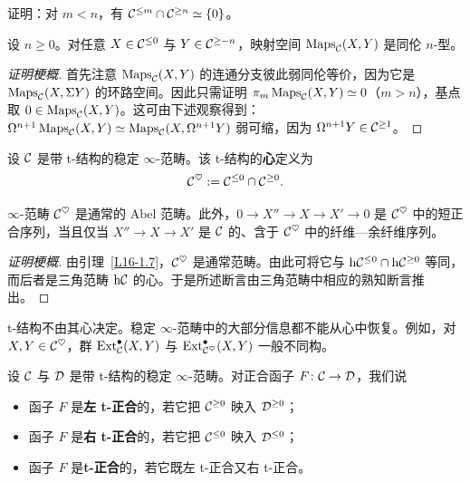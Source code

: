 \begin{exercise}\label{L16-1.6}
证明：对 $m<n$，有 $\mathcal{C}^{\le m}\cap\mathcal{C}^{\ge n}\simeq\{0\}$。
\end{exercise}

\begin{lemma}\label{L16-1.7}
设 $n\ge0$。对任意 $X\in\mathcal{C}^{\le0}$ 与 $Y\in\mathcal{C}^{\ge-n}$，映射空间 $\operatorname{Maps}_{\mathcal{C}}(X,Y)$ 是同伦 $n$-型。
\end{lemma}

\begin{proof}[证明梗概]
首先注意 $\operatorname{Maps}_{\mathcal{C}}(X,Y)$ 的连通分支彼此弱同伦等价，因为它是 $\operatorname{Maps}_{\mathcal{C}}(X,\Sigma Y)$ 的环路空间。因此只需证明 $\pi_m\operatorname{Maps}_{\mathcal{C}}(X,Y)\simeq0$（$m>n$），基点取 $0\in\operatorname{Maps}_{\mathcal{C}}(X,Y)$。这可由下述观察得到：$\Omega^{n+1}\operatorname{Maps}_{\mathcal{C}}(X,Y)\simeq\operatorname{Maps}_{\mathcal{C}}(X,\Omega^{n+1}Y)$ 弱可缩，因为 $\Omega^{n+1}Y\in\mathcal{C}^{\ge1}$。
\end{proof}

\begin{definition}\label{L16-1.8}
设 $\mathcal{C}$ 是带 t-结构的稳定 $\infty$-范畴。该 t-结构的\textbf{心}定义为
\[
\mathcal{C}^{\heartsuit}:=\mathcal{C}^{\le0}\cap\mathcal{C}^{\ge0}.
\]
\end{definition}

\begin{theorem}\label{L16-1.9}
$\infty$-范畴 $\mathcal{C}^{\heartsuit}$ 是通常的 Abel 范畴。此外，$0\to X''\to X\to X'\to 0$ 是 $\mathcal{C}^{\heartsuit}$ 中的短正合序列，当且仅当 $X''\to X\to X'$ 是 $\mathcal{C}$ 的、含于 $\mathcal{C}^{\heartsuit}$ 中的纤维—余纤维序列。
\end{theorem}

\begin{proof}[证明梗概]
由引理~\ref{L16-1.7}，$\mathcal{C}^{\heartsuit}$ 是通常范畴。由此可将它与 $\mathrm{h}\mathcal{C}^{\le0}\cap\mathrm{h}\mathcal{C}^{\ge0}$ 等同，而后者是三角范畴 $\mathrm{h}\mathcal{C}$ 的心。于是所述断言由三角范畴中相应的熟知断言推出。
\end{proof}

\begin{warning}\label{L16-1.10}
t-结构不由其心决定。稳定 $\infty$-范畴中的大部分信息都不能从心中恢复。例如，对 $X,Y\in\mathcal{C}^{\heartsuit}$，群 $\operatorname{Ext}^{\bullet}_{\mathcal{C}}(X,Y)$ 与 $\operatorname{Ext}^{\bullet}_{\mathcal{C}^{\heartsuit}}(X,Y)$ 一般不同构。
\end{warning}

\begin{definition}\label{L16-1.11}
设 $\mathcal{C}$ 与 $\mathcal{D}$ 是带 t-结构的稳定 $\infty$-范畴。对正合函子 $F\colon\mathcal{C}\to\mathcal{D}$，我们说
\begin{itemize}[leftmargin=2.2em,itemsep=0.1em]
\item 函子 $F$ 是\textbf{左 t-正合}的，若它把 $\mathcal{C}^{\ge0}$ 映入 $\mathcal{D}^{\ge0}$；
\item 函子 $F$ 是\textbf{右 t-正合}的，若它把 $\mathcal{C}^{\le0}$ 映入 $\mathcal{D}^{\le0}$；
\item 函子 $F$ 是\textbf{t-正合}的，若它既左 t-正合又右 t-正合。
\end{itemize}
\end{definition}

